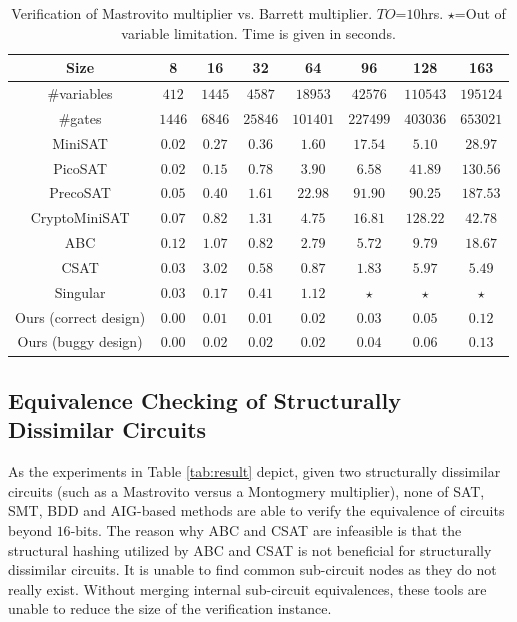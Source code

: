 \begin{table}[t]
\begin{center}
\caption{Verification of Mastrovito multiplier vs. Barrett multiplier. $TO$=$10$hrs. $\star$=Out of variable limitation.
Time is given in seconds.}
\label{tab:bvsmas}
\begin{tabular}{|c||c|c|c|c|c|c|c|} \hline 
Size   			&8  		&16       	&32       	&64      	&96   		&128  		&163		\\
\hline 
\#variables 	&$412$ 		&$1445$ 	&$4587$ 	&$18953$ 	&$42576$ 	&$110543$ 	&$195124$ 	\\
\hline 
\#gates			&$1446$  	&$6846$    	&$25846$   	&$101401$    &$227499$  &$403036$  	&$653021$ 	\\
\hline
MiniSAT   		&$0.02$  	&$0.27$   	&$0.36$  	&$1.60$    	&$17.54$ 	&$5.10$ 	&$28.97$		\\
\hline
PicoSAT   		&$0.02$  	&$0.15$   	&$0.78$  	&$3.90$    	&$6.58$ 	&$41.89$ 	&$130.56$		\\
\hline
PrecoSAT   		&$0.05$  	&$0.40$   	&$1.61$  	&$22.98$   	&$91.90$ 	&$90.25$ 	&$187.53$		\\
\hline
CryptoMiniSAT	&$0.07$  	&$0.82$   	&$1.31$  	&$4.75$    	&$16.81$ 	&$128.22$ 	&$42.78$		\\
\hline
ABC   			&$0.12$  	&$1.07$   	&$0.82$  	&$2.79$    	&$5.72$ 	&$9.79$ 	&$18.67$	\\
\hline
CSAT   			&$0.03$  	&$3.02$   	&$0.58$  	&$0.87$   	&$1.83$ 	&$5.97$ 	&$5.49$		\\
\hline
Singular		&$0.03$  	&$0.17$   	&$0.41$  	&$1.12$   	&$\star$ 	&$\star$ 	&$\star$		\\
\hline
\hline
Ours (correct design)	&$0.00$  	&$0.01$   	&$0.01$  	&$0.02$    &$0.03$  	&$0.05$  	&$0.12$ 	\\
\hline
Ours (buggy design)		&$0.00$  	&$0.02$   	&$0.02$  	&$0.02$    &$0.04$  	&$0.06$  	&$0.13$ 	\\
\hline
\end{tabular}
\end{center}
\vspace{-0.2in}
\end{table}


\subsection{Equivalence Checking of Structurally Dissimilar Circuits}
As the experiments in Table \ref{tab:result} depict, given two
structurally dissimilar circuits (such as a Mastrovito versus a
Montogmery multiplier), none of SAT, SMT, BDD and AIG-based methods
are able to verify the equivalence of circuits beyond $16$-bits.  
The reason why ABC and CSAT are infeasible is that the structural
hashing utilized by ABC and CSAT is not beneficial for structurally 
dissimilar circuits. %
It is unable to find common sub-circuit nodes as they do not really
exist. Without merging internal sub-circuit equivalences, these tools
are unable to reduce the size of the verification instance.

